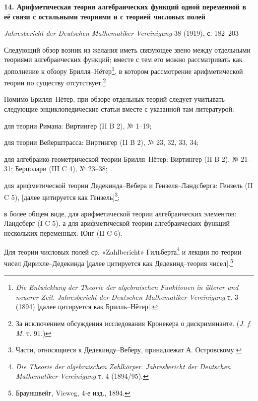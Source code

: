\documentclass[11pt]{article}
\begin{document}

\begin{center}
{\Large\bfseries 14. Арифметическая теория алгебраических функций одной переменной в её связи с остальными теориями и с теорией числовых полей\par}
\vspace{1.5em}
\emph{Jahresbericht der Deutschen Mathematiker-Vereinigung} 38 (1919), с. 182--203
\end{center}

Следующий обзор возник из желания иметь связующее звено между отдельными теориями алгебраических функций; вместе с тем его можно рассматривать как дополнение к обзору Брилля--Нётер\footnote{\emph{Die Entwicklung der Theorie der algebraischen Funktionen in älterer und neuerer Zeit}. \emph{Jahresbericht der Deutschen Mathematiker-Vereinigung} т. 3 (1894) [далее цитируется как Брилль--Нётер].}, в котором рассмотрение арифметической теории по существу отсутствует.\footnote{За исключением обсуждения исследования Кронекера о дискриминанте. (\emph{J. f. M.} т. 91.)}

Помимо Брилля--Нётер, при обзоре отдельных теорий следует учитывать следующие энциклопедические статьи вместе с указанной там литературой:

для теории Римана: Виртингер (II B 2), № 1--19;

для теории Вейерштрасса: Виртингер (II B 2), № 23, 32, 33, 34;

для алгебраико-геометрической теории Брилля--Нётер: Виртингер (II B 2), № 21--31; Берцолари (III C 4), № 23--38;

для арифметической теории Дедекинда--Вебера и Гензеля--Ландсберга: Гензель (II C 5), [далее цитируется как Гензель]\footnote{Части, относящиеся к Дедекинду--Веберу, принадлежат А. Островскому.};

в более общем виде, для арифметической теории алгебраических элементов: Ландсберг (I C 5), а для арифметической теории алгебраических функций нескольких переменных: Юнг (II C 6).

Для теории числовых полей ср. «Zahlbericht» Гильберта\footnote{\emph{Die Theorie der algebraischen Zahlkörper}. \emph{Jahresbericht der Deutschen Mathematiker-Vereinigung} т. 4 (1894/95).} и лекции по теории чисел Дирихле--Дедекинда [далее цитируется как Дедекинд--теория чисел].\footnote{Брауншвейг, Vieweg, 4-е изд., 1894.}
\end{document}
